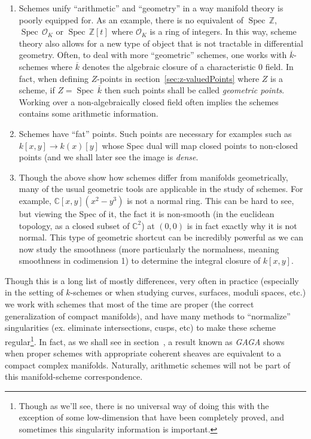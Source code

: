 \documentclass{article}
\newcommand{\C}{{\mathbb{C}}}
\newcommand{\Z}{{\mathbb{Z}}}
\newcommand{\CO}{{\mathcal{O}}}
\newcommand{\Spec}{{\operatorname{Spec}\,}}
\newcommand{\sse}{\subseteq}
\begin{document}
\begin{enumerate}
		As smooth functions on each $U \sse M$ from a sheaf, sheaves that admit a ``partition of unity'' will
		be called \emph{fine sheaves}. A weaker notion of \emph{soft sheaf} will be introduced in
		section~\cite[Sheaf Cohomology]{NateAlgGeo} that will be the closest equivalent to having the partition of unity
		property.
	\item Schemes unify ``arithmetic'' and ``geometry'' in a way manifold theory is poorly equipped for. As an
		example, there is no equivalent of $\Spec \Z$, $\Spec \CO_K$ or $\Spec \Z[t]$ where $\CO_K$ is a ring
		of integers. In this way, scheme theory also allows for a new type of object that
		is not tractable in differential geometry. Often, to deal with more ``geometric'' schemes,
		one works with $\overline{k}$-schemes where $\overline{k}$ denotes the algebraic closure of a characteristic $0$
		field. In fact, when defining $Z$-points in section~\ref{sec:z-valuedPoints} where $Z$ is a scheme, if $Z
		= \Spec{\overline{k}}$ then such points shall be called \emph{geometric points}. Working over
		a non-algebraically closed field often implies the schemes contains some arithmetic information.
	\item Schemes have ``fat'' points. Such points are necessary for examples such as $k[x,y] \to k(x)[y]$
		whose Spec dual will map closed points to non-closed points (and we shall later see the image is
		\emph{dense}.
	\item Though the above show how schemes differ from manifolds geometrically, many of the usual geometric
		tools are applicable in the study of schemes. For example, $\C[x,y](x^2-y^3)$ is not a normal ring. This can
		be hard to see, but viewing the Spec of it, the fact it is non-smooth (in the euclidean topology, as
		a closed subset of $\C^2$) at $(0,0)$ is in fact exactly
		why it is not normal. This type of geometric shortcut can be incredibly powerful as we can now study
		the smoothness (more particularly the normalness, meaning smoothness in codimension 1) to determine
		the integral closure of $k[x,y]$.
\end{enumerate}

Though this is a long list of mostly differences, very often in practice (especially in the setting of $k$-schemes or
when studying curves, surfaces, moduli spaces, etc.) we work with schemes that most of the time are proper
(the correct generalization of compact manifolds), and have many methods to ``normalize'' singularities (ex.
eliminate intersections, cusps, etc) to make these scheme regular\footnote{Though as we'll see, there is no universal
	way of doing this with the exception of some low-dimension that have been completely proved, and sometimes
this singularity information is important.}. In fact, as we shall see in section~\cite[gaga]{NateAlgGeo}, a result known as
\emph{GAGA} shows when proper schemes with appropriate coherent sheaves are equivalent to a compact complex manifolds.
Naturally, arithmetic schemes will not be part of this manifold-scheme correspondence.


\printbibliography
\end{document}
